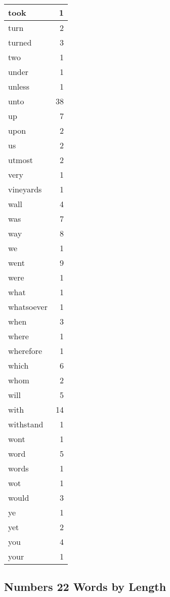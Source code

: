 \begin{center}
\begin{longtable}{l|r}
took & 1\\ \hline 
turn & 2\\ \hline 
turned & 3\\ \hline 
two & 1\\ \hline 
under & 1\\ \hline 
unless & 1\\ \hline 
unto & 38\\ \hline 
up & 7\\ \hline 
upon & 2\\ \hline 
us & 2\\ \hline 
utmost & 2\\ \hline 
very & 1\\ \hline 
vineyards & 1\\ \hline 
wall & 4\\ \hline 
was & 7\\ \hline 
way & 8\\ \hline 
we & 1\\ \hline 
went & 9\\ \hline 
were & 1\\ \hline 
what & 1\\ \hline 
whatsoever & 1\\ \hline 
when & 3\\ \hline 
where & 1\\ \hline 
wherefore & 1\\ \hline 
which & 6\\ \hline 
whom & 2\\ \hline 
will & 5\\ \hline 
with & 14\\ \hline 
withstand & 1\\ \hline 
wont & 1\\ \hline 
word & 5\\ \hline 
words & 1\\ \hline 
wot & 1\\ \hline 
would & 3\\ \hline 
ye & 1\\ \hline 
yet & 2\\ \hline 
you & 4\\ \hline 
your & 1\\ \hline 
\end{longtable}
\end{center}





\subsection{Numbers 22 Words by Length}


